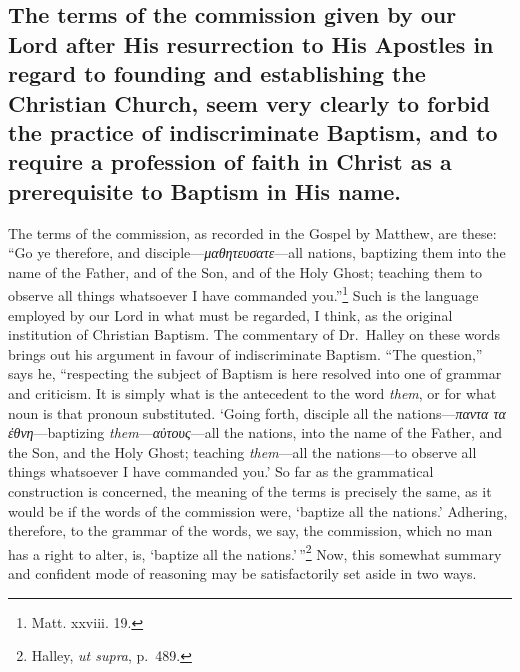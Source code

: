 \documentclass[english,]{book}
\begin{document}
\hypertarget{the-terms-of-the-commission-given-by-our-lord-after-his-resurrection-to-his-apostles-in-regard-to-founding-and-establishing-the-christian-church-seem-very-clearly-to-forbid-the-practice-of-indiscriminate-baptism-and-to-require-a-profession-of-faith-in-christ-as-a-prerequisite-to-baptism-in-his-name.}{%
\subsection{The terms of the commission given by our Lord after His resurrection to His Apostles in regard to founding and establishing the Christian Church, seem very clearly to forbid the practice of indiscriminate Baptism, and to require a profession of faith in Christ as a prerequisite to Baptism in His name.}\label{the-terms-of-the-commission-given-by-our-lord-after-his-resurrection-to-his-apostles-in-regard-to-founding-and-establishing-the-christian-church-seem-very-clearly-to-forbid-the-practice-of-indiscriminate-baptism-and-to-require-a-profession-of-faith-in-christ-as-a-prerequisite-to-baptism-in-his-name.}}

The terms of the commission, as recorded in the Gospel by Matthew, are these: ``Go ye therefore, and disciple---\emph{μαθητευσατε}---all nations, baptizing them into the name of the Father, and of the Son, and of the Holy Ghost; teaching them to observe all things whatsoever I have commanded you.''\footnote{Matt. xxviii. 19.} Such is the language employed by our Lord in what must be regarded, I think, as the original institution of Christian Baptism. The commentary of Dr.~Halley on these words brings out his argument in favour of indiscriminate Baptism. ``The question,'' says he, ``respecting the subject of Baptism is here resolved into one of grammar and criticism. It is simply what is the antecedent to the word \emph{them}, or for what noun is that pronoun substituted. `Going forth, disciple all the nations---\emph{παντα τα ἐθνη}---baptizing \emph{them}---\emph{αὐτους}---all the nations, into the name of the Father, and the Son, and the Holy Ghost; teaching \emph{them}---all the nations---to observe all things whatsoever I have commanded you.' So far as the grammatical construction is concerned, the meaning of the terms is precisely the same, as it would be if the words of the commission were, `baptize all the nations.' Adhering, therefore, to the grammar of the words, we say, the commission, which no man has a right to alter, is, `baptize all the nations.'\,''\footnote{Halley, \emph{ut supra}, p.~489.} Now, this somewhat summary and confident mode of reasoning may be satisfactorily set aside in two ways.
\end{document}
